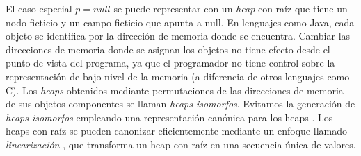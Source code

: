 El caso especial $p = null$ se puede representar con un \emph{heap} con raíz que tiene un nodo ficticio y un campo ficticio que apunta a null. En lenguajes como Java, cada objeto se identifica por la dirección de memoria donde se encuentra. Cambiar las direcciones de memoria donde se asignan los objetos no tiene efecto desde el punto de vista del programa, ya que el programador no tiene control sobre la representación de bajo nivel de la memoria (a diferencia de otros lenguajes como C). Los \emph{heaps} obtenidos mediante permutaciones de las direcciones de memoria de sus objetos componentes se llaman \emph{heaps isomorfos}. Evitamos la generación de \emph{heaps isomorfos} empleando una representación canónica para los heaps \cite{Iosif02,Boyapati02}. Los heaps con raíz se pueden canonizar eficientemente mediante un enfoque llamado \emph{linearización} \cite{Iosif02,Xie04}, que transforma un heap con raíz en una secuencia única de valores.

\bigbreak





